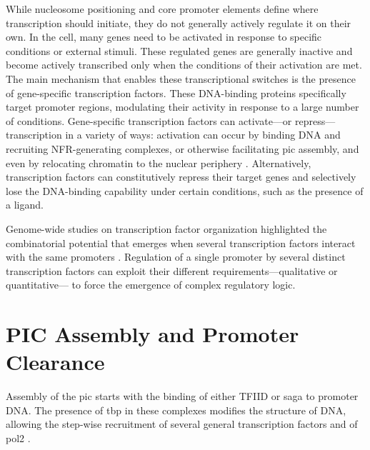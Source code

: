 While nucleosome positioning and core promoter elements define where transcription should initiate, they do not generally actively regulate it on their own.  
In the cell, many genes need to be activated in response to specific conditions or external stimuli.
These regulated genes are generally inactive and become actively transcribed only when the conditions of their activation are met.
The main mechanism that enables these transcriptional switches is the presence of gene-specific transcription factors.
These DNA-binding proteins specifically target promoter regions, modulating their activity in response to a large number of conditions.
Gene-specific transcription factors can activate---or repress---transcription in a variety of ways: activation can occur by binding DNA and recruiting NFR-generating complexes, or otherwise facilitating \gls{pic} assembly, and even by relocating chromatin to the nuclear periphery \citep{randisehinchliff:2016:transcription}.
Alternatively, transcription factors can constitutively repress their target genes and selectively lose the DNA-binding capability under certain conditions, such as the presence of a ligand.

Genome-wide studies on transcription factor organization highlighted the combinatorial potential that emerges when several transcription factors interact with the same promoters \cite{harbison:2004:transcriptional}.
Regulation of a single promoter by several distinct transcription factors can exploit their different requirements---qualitative or quantitative--- to force the emergence of complex regulatory logic.

\section{PIC Assembly and Promoter Clearance}



Assembly of the \acrlong{pic} starts with the binding of either TFIID or \gls{saga} to promoter DNA.
The presence of \gls{tbp} in these complexes modifies the structure of DNA, allowing the step-wise recruitment of several general transcription factors and of \gls{pol2} \citep[For review see][]{sainsbury:2015:structural}.

